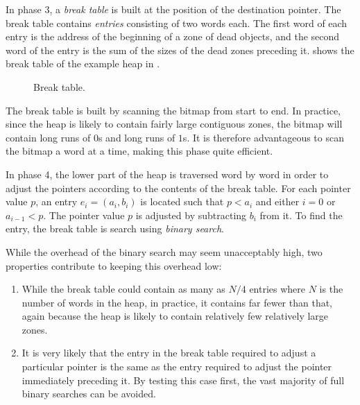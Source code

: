 In phase 3, a \emph{break table} is built at the position of the
destination pointer.  The break table contains \emph{entries}
consisting of two words each.  The first word of each entry is the
address of the beginning of a zone of dead objects, and the second
word of the entry is the sum of the sizes of the dead zones preceding
it.   shows the break table of the example heap
in .

\begin{figure}
\begin{center}
\end{center}
\caption{\label{fig-example-d}
Break table.}
\end{figure}

The break table is built by scanning the bitmap from start to end.  In
practice, since the heap is likely to contain fairly large contiguous
zones, the bitmap will contain long runs of $0$s and long runs of
$1$s.  It is therefore advantageous to scan the bitmap a word at a
time, making this phase quite efficient. 

In phase 4, the lower part of the heap is traversed word by word in
order to adjust the pointers according to the contents of the break
table.  For each pointer value $p$, an entry $e_i = (a_i,b_i)$ is
located such that $p < a_i$ and either $i = 0$ or $a_{i-1} < p$.  The
pointer value $p$ is adjusted by subtracting $b_i$ from it.  To find
the entry, the break table is search using \emph{binary search}.

While the overhead of the binary search may seem unacceptably high,
two properties contribute to keeping this overhead low:

\begin{enumerate}
\item While the break table could contain as many as $N/4$ entries
  where $N$ is the number of words in the heap, in practice, it
  contains far fewer than that, again because the heap is likely to
  contain relatively few relatively large zones.
\item It is very likely that the entry in the break table required to
  adjust a particular pointer is the same as the entry required to
  adjust the pointer immediately preceding it.  By testing this case
  first, the vast majority of full binary searches can be avoided.
\end{enumerate}
